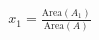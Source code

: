 \documentclass[preview]{standalone}
\begin{document}
\begin{align*}
x_1 = \frac{\text{Area}(A_1)}{\text{Area}(A)}
\end{align*}
\end{document}
